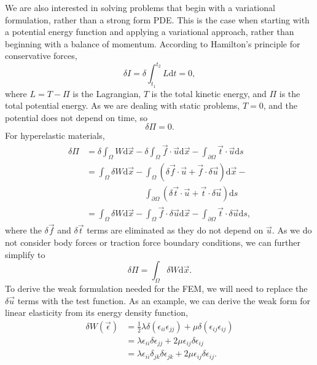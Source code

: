 We are also interested in solving problems that begin with a variational formulation, rather than a strong form \ac{PDE}.
This is the case when starting with a potential energy function and applying a variational approach, rather than beginning with a balance of momentum.
According to Hamilton's principle for conservative forces,
\begin{equation}
    \delta I = \delta \int_{t_{1}}^{t_{2}} L \mathrm{d} t = 0,
\end{equation}
where $L = T - \Pi$ is the Lagrangian, $T$ is the total kinetic energy, and $\Pi$ is the total potential energy.
As we are dealing with static problems, $T = 0$, and the potential does not depend on time, so
\begin{equation}
    \delta \Pi = 0.
\end{equation}
For hyperelastic materials,
\begin{align}
    \delta \Pi &= \delta \int_{\Omega} W \mathrm{d} \vec{x} - \delta \int_{\Omega} \vec{f} \cdot \vec{u} \mathrm{d} \vec{x} - \int_{\partial \Omega} \vec{t} \cdot \vec{u} \mathrm{d} s \nonumber\\
               &= \int_{\Omega} \delta W \mathrm{d} \vec{x} - \int_{\Omega} (\delta \vec{f} \cdot \vec{u} + \vec{f} \cdot \delta \vec{u}) \mathrm{d} \vec{x} - \nonumber\\
               &\phantom{{}= \int_{\Omega} \delta W \mathrm{d} \vec{x} -} \int_{\partial \Omega} (\delta \vec{t} \cdot \vec{u} + \vec{t} \cdot \delta \vec{u}) \mathrm{d} s \nonumber\\
               &= \int_{\Omega} \delta W \mathrm{d} \vec{x} - \int_{\Omega} \vec{f} \cdot \delta \vec{u} \mathrm{d} \vec{x} - \int_{\partial \Omega} \vec{t} \cdot \delta \vec{u} \mathrm{d} s,
\end{align}
where the $\delta \vec{f}$ and $\delta \vec{t}$ terms are eliminated as they do not depend on $\vec{u}$.
As we do not consider body forces or traction force boundary conditions, we can further simplify to
\begin{equation}
    \delta \Pi = \int_{\Omega} \delta W \mathrm{d} \vec{x}.
\end{equation}
To derive the weak formulation needed for the \ac{FEM}, we will need to replace the $\delta \vec{u}$ terms with the test function.
As an example, we can derive the weak form for linear elasticity from its energy density function,
\begin{align}
    \delta W(\vec{\epsilon}) &= \frac{1}{2} \lambda \delta(\epsilon_{ii} \epsilon_{jj}) + \mu \delta(\epsilon_{ij} \epsilon_{ij}) \nonumber\\
                             &= \lambda \epsilon_{ii} \delta \epsilon_{jj} + 2 \mu \epsilon_{ij} \delta \epsilon_{ij} \nonumber\\
                             &= \lambda \epsilon_{ii} \delta_{jk} \delta \epsilon_{jk} + 2 \mu \epsilon_{ij} \delta \epsilon_{ij}.
\end{align}
